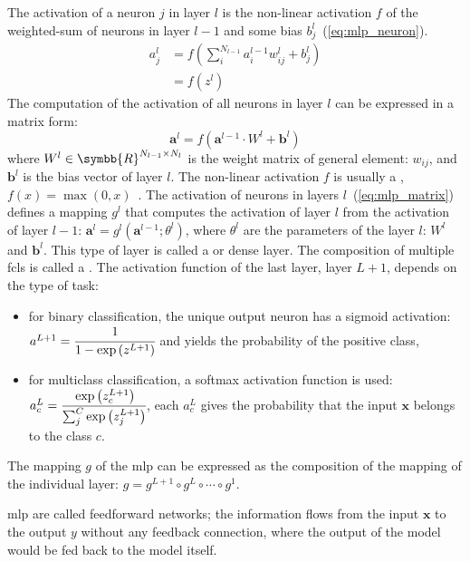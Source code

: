 \documentclass[../main.tex]{subfiles}
\begin{document}
		The activation of a neuron \(j\) in layer \(l\) is the non-linear activation \(f\) of the weighted-sum of neurons in layer \(l-1\) and some bias \(b_{j}^{l}\)~(\cref{eq:mlp_neuron}).
		\begin{align}
			a_{j}^{l} & = f\left(\sum_{i}^{N_{l-1}}a_{i}^{l-1}w_{ij}^{l} + b_{j}^{l} \right) \\ \label{eq:mlp_neuron}
			          & = f\left(z^{l}\right)
		\end{align}
		The computation of the activation of all neurons in layer \(l\) can be expressed in a matrix form:
		\begin{equation}
			\symbf{a}^{l} = f\left( \symbf{a}^{l-1} \cdot W^l + \symbf{b}^{l} \right) \label{eq:mlp_matrix}
		\end{equation}
		where \(W^l \in \symbb{R}^{N_{l-1} \times N_{l}}\) is the weight matrix of general element: \(w_{ij}\), and \(\symbf{b}^{l}\) is the bias vector of layer \(l\).
		The non-linear activation \(f\) is usually a , \(f\left(x\right) = \max\left(0, x\right)\)~\cite{ReluRef}.
		The activation of neurons in layers \(l\)~(\cref{eq:mlp_matrix}) defines a mapping \(g^{l}\) that computes the activation of layer \(l\) from the activation of layer \(l-1\): \( \symbf{a}^{l} = g^{l}\left(\symbf{a}^{l-1}; \theta^{l}\right)\), where \(\theta^{l}\) are the parameters of the layer \(l\): \(W^l\) and \( \symbf{b}^{l}\).
		This type of layer is called a  or dense layer.
		The composition of multiple \glspl{fcl} is called a .
		The activation function of the last layer, layer \(L+1\), depends on the type of task:
		\begin{itemize}
			\item for binary classification, the unique output neuron has a sigmoid activation: \(a^{L+1} = \cfrac{1}{1-\exp\left(z^{L+1}\right)}\) and yields the probability of the positive class,
			\item for multiclass classification, a softmax activation function is used: \(a_{c}^{L} = \cfrac{\exp\left(z_{c}^{L+1}\right)}{\sum_{j}^{C}\exp\left(z_{j}^{L+1}\right)}\), each \(a_{c}^{L}\) gives the probability that the input \(\symbf{x}\) belongs to the class \(c\).
		\end{itemize}
		The mapping \(g\) of the \gls{mlp} can be expressed as the composition of the mapping of the individual layer: \(g = g^{L+1} \circ g^{L} \circ \cdots \circ g^{1}\).

		\Gls{mlp} are called feedforward networks; the information flows from the input \(\symbf{x}\) to the output \(y\) without any feedback connection, where the output of the model would be fed back to the model itself.
\end{document}
